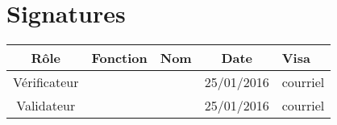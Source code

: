 \documentclass [a4paper] {article}
\begin{document}
\section*{Signatures}

		\begin{center}
			\begin{tabular}{| c | c | c | c | p{4cm} |}
				\hline
				\rowcolor{Gray}
				Rôle & Fonction & Nom & Date & Visa		 \\
				\hline
				Vérificateur & \RQA & \Kafui & 25/01/2016 & courriel \\[30pt]
				\hline
				Validateur & \CP & \Sergi & 25/01/2016 & courriel \\[30pt]	
				\hline
			\end{tabular}
		\end{center}
\end{document}
